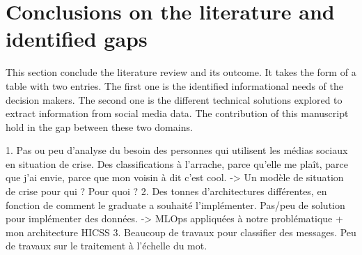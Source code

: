 
\section{Conclusions on the literature and identified gaps}
This section conclude the literature review and its outcome.
It takes the form of a table with two entries.
The first one is the identified informational needs of the decision makers.
The second one is the different technical solutions explored to extract information from social media data.
The contribution of this manuscript hold in the gap between these two domains.

1. Pas ou peu d'analyse du besoin des personnes qui utilisent les médias sociaux en situation de crise. Des classifications à l'arrache, parce qu'elle me plaît, parce que j'ai envie, parce que mon voisin à dit c'est cool.
-> Un modèle de situation de crise pour qui ? Pour quoi ?
2. Des tonnes d'architectures différentes, en fonction de comment le graduate a souhaité l'implémenter. Pas/peu de solution pour implémenter des données.
-> MLOps appliquées à notre problématique + mon architecture HICSS
3. Beaucoup de travaux pour classifier des messages. Peu de travaux sur le traitement à l'échelle du mot.



